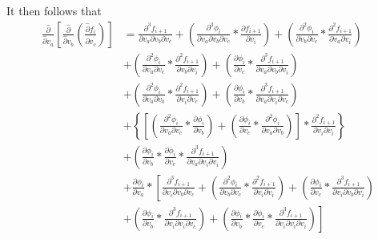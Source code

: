 \documentclass[12pt,letter]{article}
\begin{document}
	It then follows that
	\begin{equation}
	\begin{split}
	\frac{\hat{\partial}}{\hat{\partial}  v_a}\left[\frac{\hat{\partial}}{\hat{\partial} v_b}\left(\frac{\hat{\partial} f_i}{\hat{\partial} v_c}\right)\right]
	&= 
	\frac{\partial^3 f_{i+1}}{\partial v_a \partial v_b \partial v_c} + 
	\left(\frac{\partial^3 \phi_i}{\partial v_a \partial v_b \partial v_c} * \frac{\partial f_{i+1}}{\partial v_i}\right) + 
	\left(\frac{\partial^2 \phi_i}{\partial v_b \partial v_c} * \frac{\partial^2 f_{i+1}}{\partial v_a \partial v_i}\right)
	\\
	&+
	\left(\frac{\partial^2 \phi_i}{\partial v_a \partial v_c} * \frac{\partial^2 f_{i+1}}{\partial v_b \partial v_i}\right) + 
	\left(\frac{\partial \phi_i}{\partial v_c} * \frac{\partial^3 f_{i+1}}{\partial v_a \partial v_b \partial v_i}\right)
	\\
	&+
	\left(\frac{\partial^2 \phi_i}{\partial v_a \partial v_b} * \frac{\partial^2 f_{i+1}}{\partial v_i \partial v_c}\right) + 
	\left(\frac{\partial \phi_i}{\partial v_b} * \frac{\partial^3 f_{i+1}}{\partial v_a \partial v_i \partial v_c}\right)
	\\
	&+
	\left\{\left[\left(\frac{\partial^2 \phi_i}{\partial v_a \partial v_c} * \frac{\partial \phi_i}{\partial v_b}\right) + 
	\left(\frac{\partial \phi_i}{\partial v_c} * \frac{\partial^2 \phi_i}{\partial v_a \partial v_b}\right)\right] * \frac{\partial^2 f_{i+1}}{\partial v_i \partial v_i}\right\}
	\\
	&+
	\left(\frac{\partial \phi_i}{\partial v_b} * \frac{\partial \phi_i}{\partial v_c} * \frac{\partial^3 f_{i+1}}{\partial v_a \partial v_i \partial v_i}\right)
	\\
	&+
	\frac{\partial \phi_i}{\partial v_a} * 
	\left[\frac{\partial^3 f_{i+1}}{\partial v_i \partial v_b \partial v_c} + 
	\left(\frac{\partial^2 \phi_i}{\partial v_b \partial v_c} * \frac{\partial^2 f_{i+1}}{\partial v_i \partial v_i}\right) + 
	\left(\frac{\partial \phi_i}{\partial v_c} * \frac{\partial^3 f_{i+1}}{\partial v_i \partial v_b \partial v_i}\right)
	\right.
	\\
	&+
	\left.
	\left(\frac{\partial \phi_i}{\partial v_b} * \frac{\partial^3 f_{i+1}}{\partial v_i \partial v_i \partial v_c}\right) + 
	\left(\frac{\partial \phi_i}{\partial v_b} * \frac{\partial \phi_i}{\partial v_c} * \frac{\partial^3 f_{i+1}}{\partial v_i \partial v_i \partial v_i}\right)\right]
	\end{split}
	\end{equation}
	
\end{document}
